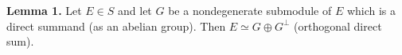 \textbf{Lemma 1.} Let $E \in S$ and let $G$ be a nondegenerate submodule of $E$ which is a direct summand (as an abelian group). Then $E \simeq G \oplus G^\perp$ (orthogonal direct sum).
